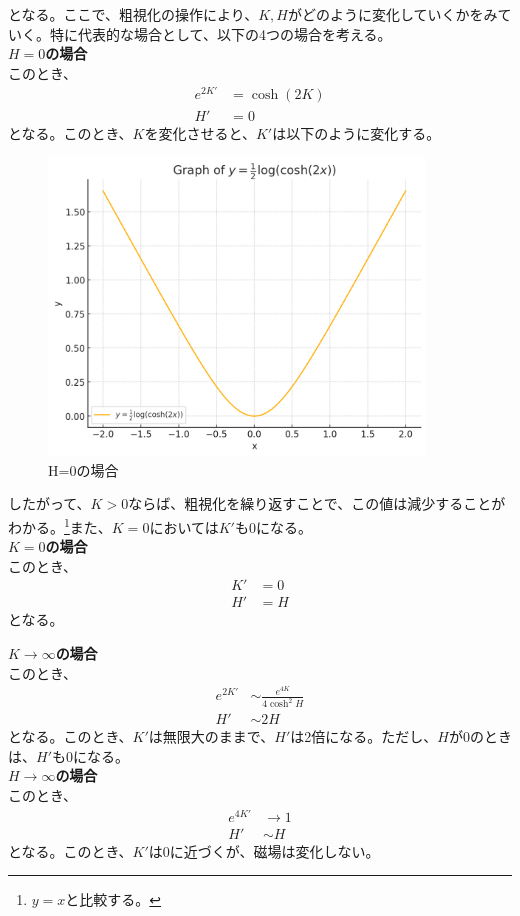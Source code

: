 \documentclass[a4paper,11pt]{jsarticle}
\numberwithin{equation}{section}
\begin{document}
となる。ここで、粗視化の操作により、$K,H$がどのように変化していくかをみていく。特に代表的な場合として、以下の4つの場合を考える。\\
\textbf{$H=0$の場合}\\
このとき、
\begin{align}
    e^{2K'} &= \cosh(2K)\\
    H' &= 0
\end{align}
となる。このとき、$K$を変化させると、$K'$は以下のように変化する。
\begin{figure}[H]
    \begin{center}
    \includegraphics[width=100mm]{H0.png}
    \end{center}
    \caption{H=0の場合}
    \label{fig:one}
\end{figure}
したがって、$K>0$ならば、粗視化を繰り返すことで、この値は減少することがわかる。\footnote{$y=x$と比較する。}また、$K=0$においては$K'$も0になる。\\

\textbf{$K=0$の場合}\\
このとき、
\begin{align}
    K' &= 0\\
    H' &= H
\end{align}
となる。

\textbf{$K \to \infty$の場合}\\
このとき、
\begin{align}
    \label{eq:K}
    e^{2K'} &\sim \frac{e^{4K}}{4\cosh^2 H}\\
    H' &\sim 2H 
\end{align}
となる。このとき、$K'$は無限大のままで、$H'$は2倍になる。ただし、$H$が0のときは、$H'$も0になる。\\

\textbf{$H \to \infty$の場合}\\ 
このとき、
\begin{align}
    e^{4K'} &\to 1\\
    H' &\sim H
\end{align}
となる。このとき、$K'$は0に近づくが、磁場は変化しない。\\
\end{document}
